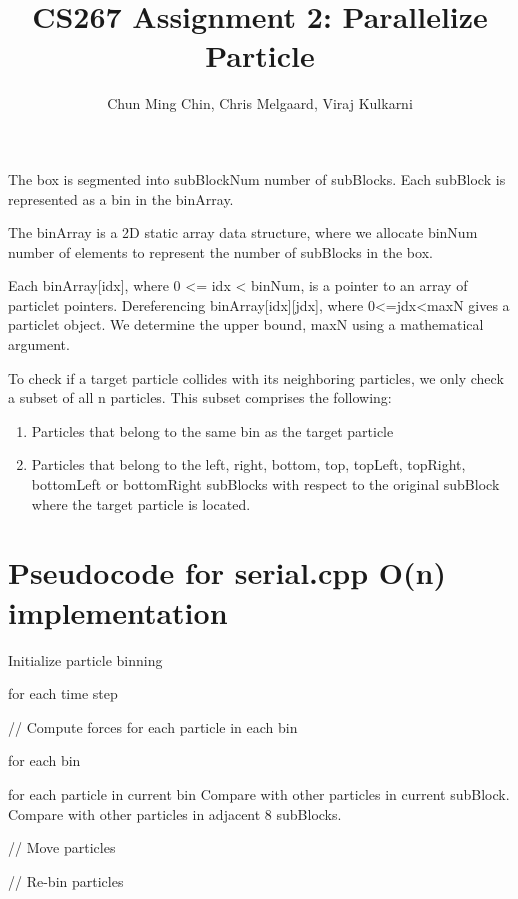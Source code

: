\documentclass[11pt]{amsart}
\title{CS267 Assignment 2: Parallelize Particle}
\author{Chun Ming Chin, Chris Melgaard, Viraj Kulkarni }
\begin{document}
\maketitle



The box is segmented into subBlockNum number of subBlocks. Each subBlock is represented as a bin in the binArray.

The binArray is a 2D static array data structure, where we allocate binNum number of elements to represent the number of subBlocks in the box. 

Each binArray[idx], where 0 <= idx < binNum, is a pointer to an array of particlet pointers. Dereferencing binArray[idx][jdx], where 0<=jdx<maxN gives a particlet object. We determine the upper bound, maxN using a mathematical argument. 

To check if a target particle collides with its neighboring particles, we only check a subset of all n particles. This subset comprises the following: 
\begin{enumerate}
\item Particles that belong to the same bin as the target particle
\item Particles that belong to the left, right, bottom, top, topLeft, topRight, bottomLeft or bottomRight subBlocks with respect to the original subBlock where the target particle is located. 
\end{enumerate}


\section{Pseudocode for serial.cpp O(n) implementation}

Initialize particle binning

for each time step {

   // Compute forces for each particle in each bin
   
   for each bin {
   
      for each particle in current bin {
         Compare with other particles in current subBlock.
         Compare with other particles in adjacent 8 subBlocks.
      }    
   }
   
   // Move particles
   
   // Re-bin particles
   
   
}
\end{document}
